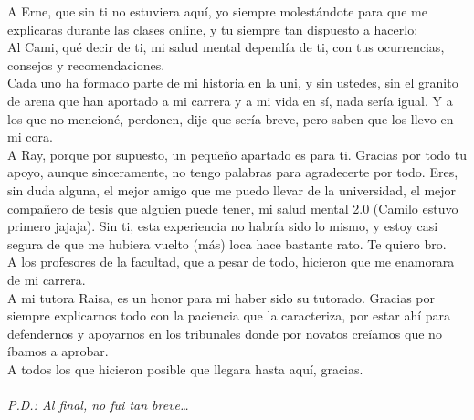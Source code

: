 A Erne, que sin ti no estuviera aquí, yo siempre molestándote para que me explicaras durante las clases online, y tu siempre tan dispuesto a hacerlo;\\
Al Cami, qué decir de ti, mi salud mental dependía de ti, con tus ocurrencias, consejos y recomendaciones. \\
Cada uno ha formado parte de mi historia en la uni, y sin ustedes, sin el granito de arena que han aportado a mi carrera y a mi vida en sí, nada sería igual. Y a los que no mencioné, perdonen, dije que sería breve, pero saben que los llevo en mi cora. \\
A Ray, porque por supuesto, un pequeño apartado es para ti. Gracias por todo tu apoyo, aunque sinceramente, no tengo palabras para agradecerte por todo. Eres, sin duda alguna, el mejor amigo que me puedo llevar de la universidad, el mejor compañero de tesis que alguien puede tener, mi salud mental 2.0 (Camilo estuvo primero jajaja). Sin ti, esta experiencia no habría sido lo mismo, y estoy casi segura de que me hubiera vuelto (más) loca hace bastante rato. Te quiero bro. \\
A los profesores de la facultad, que a pesar de todo, hicieron que me enamorara de mi carrera. \\
A mi tutora Raisa, es un honor para mi haber sido su tutorado. Gracias por siempre explicarnos todo con la paciencia que la caracteriza, por estar ahí para defendernos y apoyarnos en los tribunales donde por novatos creíamos que no íbamos a aprobar. \\
A todos los que hicieron posible que llegara hasta aquí, gracias. \\ \\
\textit{P.D.: Al final, no fui tan breve…}